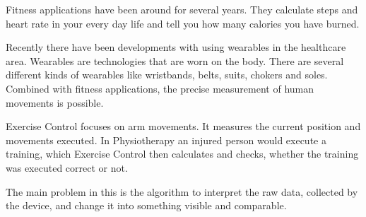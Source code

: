 Fitness applications have been around for several years. They calculate steps and heart rate in your every day life and tell you how many calories you have burned.

Recently there have been developments with using wearables in the healthcare area. Wearables are technologies that are worn on the body. There are several different kinds of wearables like wristbands, belts, suits, chokers and soles. Combined with fitness applications, the precise measurement of human movements is possible.

Exercise Control focuses on arm movements. It measures the current position and movements executed. In Physiotherapy an injured person would execute a training, which Exercise Control then calculates and checks, whether the training was executed correct or not.

The main problem in this is the algorithm to interpret the raw data, collected by the device, and change it into something visible and comparable.